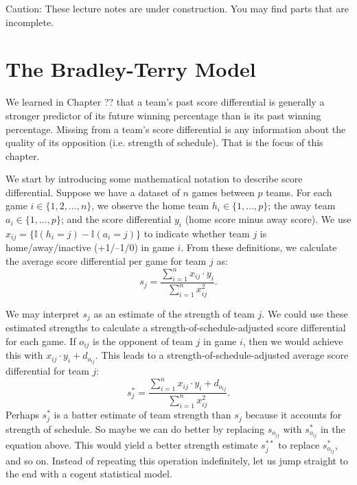 \documentclass{article}
\begin{document}
\begin{framed}
  {\sc Caution:} These lecture notes are under construction. You may find parts that are incomplete.
\end{framed}

\setcounter{section}{2}
\section{\sc The Bradley-Terry Model}

  We learned in Chapter ?? that a team's past score differential is generally a stronger predictor of its future winning percentage than is its past winning percentage. Missing from a team's score differential is any information about the quality of its opposition (i.e. strength of schedule). That is the focus of this chapter.

  We start by introducing some mathematical notation to describe score differential. Suppose we have a dataset of $n$ games between $p$ teams. For each game $i \in \{1, 2, ..., n\}$, we observe the home team $h_i \in \{1, ..., p\}$; the away team $a_i \in \{1, ..., p\}$; and the score differential $y_i$ (home score minus away score). We use $x_{ij} = \{\mathbb{I}(h_i = j) - \mathbb{I}(a_i = j)\}$ to indicate whether team $j$ is home/away/inactive (+1/--1/0) in game $i$. From these definitions, we calculate the average score differential per game for team $j$ as:
  \begin{equation*}
    s_j = \frac{
      \sum_{i=1}^n x_{ij} \cdot y_i
    }{
      \sum_{i=1}^n x_{ij}^2
    }.
  \end{equation*}

  We may interpret $s_j$ as an estimate of the strength of team $j$. We could use these estimated strengths to calculate a strength-of-schedule-adjusted score differential for each game. If $o_{ij}$ is the opponent of team $j$ in game $i$, then we would achieve this with $x_{ij} \cdot y_i + d_{o_{ij}}$. This leads to a strength-of-schedule-adjusted average score differential for team $j$:
  \begin{equation}
    \label{eqn-adjusted-point-differential}
    s^*_j = \frac{
      \sum_{i=1}^n x_{ij} \cdot y_i + d_{o_{ij}}
    }{
      \sum_{i=1}^n x_{ij}^2
    }.
  \end{equation}
  Perhaps $s^*_j$ is a batter estimate of team strength than $s_j$ because it accounts for strength of schedule. So maybe we can do better by replacing $s_{o_{ij}}$ with $s^*_{o_{ij}}$ in the equation above. This would yield a better strength estimate $s^{**}_j$ to replace $s^*_{o_{ij}}$, and so on. Instead of repeating this operation indefinitely, let us jump straight to the end with a cogent statistical model.
\end{document}
